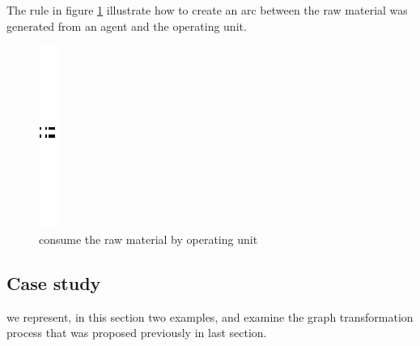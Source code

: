  
The rule in figure \ref{fig:consume the raw material by operating unit} illustrate how to create an arc between 
the raw material was generated from an agent and the operating unit.
\vspace{1cm}
\begin{figure}[th]
\centering
		\quad{}\quad{}
			\includegraphics{ch3/img/sep}
	\quad{}\quad{}
\caption{\label{fig:consume the raw material by operating unit} consume the raw material by operating unit}
\end{figure}

\pagebreak


\subsection{Case study}
we represent, in this section two examples, and examine the graph transformation process that was proposed previously in last section.
